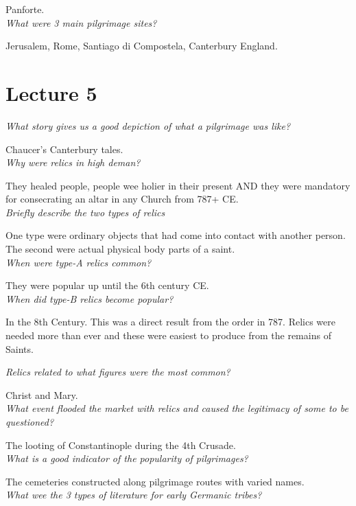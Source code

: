 \documentclass[12pt]{article}
\begin{document}
Panforte.\\

\textit{What were 3 main pilgrimage sites?}

Jerusalem, Rome, Santiago di Compostela, Canterbury England.


\section*{Lecture 5}

\textit{What story gives us a good depiction of what a pilgrimage was like?}

Chaucer's Canterbury tales.\\

\textit{Why were relics in high deman?}

They healed people, people wee holier in their present AND they were mandatory for consecrating an altar in any Church from 787+ CE.\\

\textit{Briefly describe the two types of relics}

One type were ordinary objects that had come into contact with another person. The second were actual physical body parts of a saint.\\

\textit{When were type-A relics common?}

They were popular up until the 6th century CE.\\

\textit{When did type-B relics become popular?}

In the 8th Century. This was a direct result from the order in 787. Relics were needed more than ever and these were easiest to produce from the remains of Saints.

\textit{Relics related to what figures were the most common?}

Christ and Mary.\\

\textit{What event flooded the market with relics and caused the legitimacy of some to be questioned?}

The looting of Constantinople during the 4th Crusade.\\

\textit{What is a good indicator of the popularity of pilgrimages?}

The cemeteries constructed along pilgrimage routes with varied names.\\

\textit{What wee the 3 types of literature for early Germanic tribes?}
\end{document}
